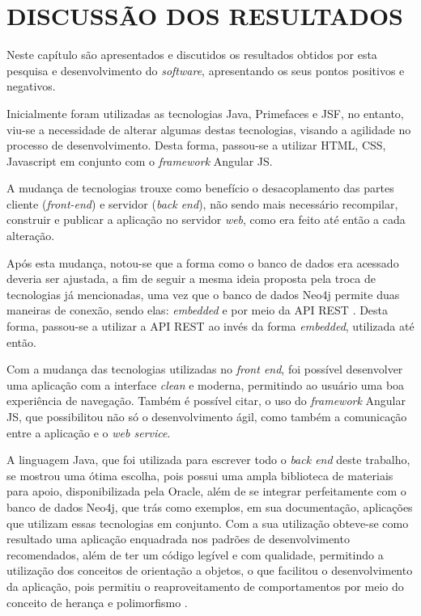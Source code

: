 \chapter{DISCUSSÃO DOS RESULTADOS} 

\par Neste capítulo são apresentados e discutidos os resultados obtidos por esta pesquisa e desenvolvimento do \textit{software}, apresentando os seus pontos positivos e negativos.

\par Inicialmente foram utilizadas as tecnologias Java, Primefaces e JSF, no entanto, viu-se a necessidade de alterar algumas destas tecnologias, visando a agilidade no processo de desenvolvimento. Desta forma, passou-se a utilizar HTML, CSS, Javascript em conjunto com o \textit{framework} Angular JS.

\par A mudança de tecnologias trouxe como benefício o desacoplamento das partes cliente (\textit{front-end}) e servidor (\textit{back end}), não sendo mais necessário recompilar, construir e publicar a aplicação no servidor \textit{web}, como era feito até então a cada alteração.

\par Após esta mudança, notou-se que a forma como o banco de dados era acessado deveria ser ajustada, a fim de seguir a mesma ideia proposta pela troca de tecnologias já mencionadas, uma vez que o banco de dados Neo4j permite duas maneiras de conexão, sendo elas: \textit{embedded} e por meio da API REST \cite{robinson_webber_eifrem_graph_databases}. Desta forma, passou-se a utilizar a API REST ao invés da forma \textit{embedded}, utilizada até então.

\par Com a mudança das tecnologias utilizadas no \textit{front end}, foi possível desenvolver uma aplicação com a interface \textit{clean} e moderna, permitindo ao usuário uma boa experiência de navegação. Também é possível citar, o uso do \textit{framework} Angular JS, que possibilitou não só o desenvolvimento ágil, como também a comunicação entre a aplicação e o \textit{web service}.

\par A linguagem Java, que foi utilizada para escrever todo o \textit{back end} deste trabalho, se mostrou uma ótima escolha, pois possui uma ampla biblioteca de materiais para apoio, disponibilizada pela Oracle, além de se integrar perfeitamente com o banco de dados Neo4j, que trás como exemplos, em sua documentação, aplicações que utilizam essas tecnologias em conjunto. Com a sua utilização obteve-se como resultado uma aplicação enquadrada nos padrões de desenvolvimento recomendados, além de ter um código legível e com qualidade, permitindo a utilização dos conceitos de orientação a objetos, o que facilitou o desenvolvimento da aplicação, pois permitiu o reaproveitamento de comportamentos por meio do conceito de herança e polimorfismo \cite{schildt_java_complete_reference}.

